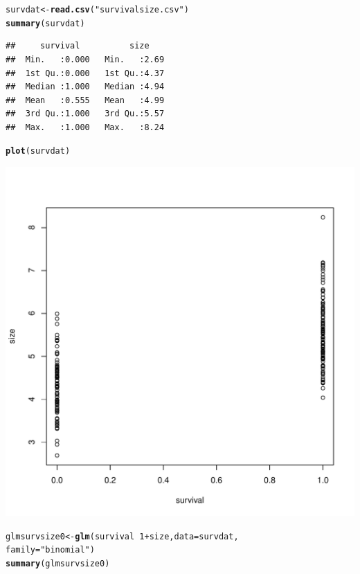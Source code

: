 \documentclass[12pt,a4paper]{scrartcl}\usepackage[]{graphicx}\usepackage[]{color}
\makeatletter
\def\maxwidth{ %
  \ifdim\Gin@nat@width>\linewidth
    \linewidth
  \else
    \Gin@nat@width
  \fi
}
\newcommand{\hlnum}[1]{\textcolor[rgb]{0.686,0.059,0.569}{#1}}%
\newcommand{\hlstr}[1]{\textcolor[rgb]{0.192,0.494,0.8}{#1}}%
\newcommand{\hlopt}[1]{\textcolor[rgb]{0,0,0}{#1}}%
\newcommand{\hlstd}[1]{\textcolor[rgb]{0.345,0.345,0.345}{#1}}%
\newcommand{\hlkwb}[1]{\textcolor[rgb]{0.69,0.353,0.396}{#1}}%
\newcommand{\hlkwc}[1]{\textcolor[rgb]{0.333,0.667,0.333}{#1}}%
\newcommand{\hlkwd}[1]{\textcolor[rgb]{0.737,0.353,0.396}{\textbf{#1}}}%
\newenvironment{kframe}{%
 \def\at@end@of@kframe{}%
 \ifinner\ifhmode%
  \def\at@end@of@kframe{\end{minipage}}%
  \begin{minipage}{\columnwidth}%
 \fi\fi%
 \def\FrameCommand##1{\hskip\@totalleftmargin \hskip-\fboxsep
 \colorbox{shadecolor}{##1}\hskip-\fboxsep
     \hskip-\linewidth \hskip-\@totalleftmargin \hskip\columnwidth}%
 \MakeFramed {\advance\hsize-\width
   \@totalleftmargin\z@ \linewidth\hsize
   \@setminipage}}%
 {\par\unskip\endMakeFramed%
 \at@end@of@kframe}
\newenvironment{knitrout}{}{} %
\makeatother
\begin{document}
\begin{Answer}
\begin{knitrout}
\color{fgcolor}\begin{kframe}
\begin{alltt}
\hlstd{survdat} \hlkwb{<-} \hlkwd{read.csv}\hlstd{(}\hlstr{"survivalsize.csv"}\hlstd{)}
\hlkwd{summary}\hlstd{(survdat)}
\end{alltt}
\begin{verbatim}
##     survival          size     
##  Min.   :0.000   Min.   :2.69  
##  1st Qu.:0.000   1st Qu.:4.37  
##  Median :1.000   Median :4.94  
##  Mean   :0.555   Mean   :4.99  
##  3rd Qu.:1.000   3rd Qu.:5.57  
##  Max.   :1.000   Max.   :8.24
\end{verbatim}
\begin{alltt}
\hlkwd{plot}\hlstd{(survdat)}
\end{alltt}
\end{kframe}
\includegraphics[width=\maxwidth]{figure/unnamed-chunk-2-1} 
\begin{kframe}\begin{alltt}
\hlstd{glmsurvsize0} \hlkwb{<-} \hlkwd{glm}\hlstd{(survival} \hlopt{~} \hlnum{1} \hlopt{+} \hlstd{size,} \hlkwc{data} \hlstd{= survdat,}
                    \hlkwc{family} \hlstd{=} \hlstr{"binomial"}\hlstd{)}
\hlkwd{summary}\hlstd{(glmsurvsize0)}

\end{alltt}
\end{kframe}
\end{knitrout}
\end{Answer}
\end{document}
